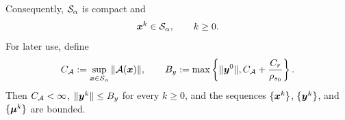 \begin{lemma}
\begin{equation}
    \label{eq:potential-and-objective-upper-bounds}
\end{equation}
Consequently, $\mathcal{S}_\alpha$ is compact and
\begin{equation}
    \bm{x}^k\in\mathcal{S}_\alpha,
    \qquad k\ge0.
    \label{eq:derived-x-trajectory-bound}
\end{equation}
For later use, define
\begin{equation}
    C_{\mathcal{A}}:=\sup_{\bm{x}\in\mathcal{S}_\alpha}\|\mathcal{A}(\bm{x})\|,
    \qquad
    B_y:=\max\left\{\|\bm{y}^0\|,C_{\mathcal{A}}+\frac{C_r}{\rho_{s_0}}\right\}.
    \label{eq:derived-operator-bounds}
\end{equation}
Then $C_{\mathcal{A}}<\infty$, $\|\bm{y}^k\|\le B_y$ for every $k\ge0$, and the sequences
$\{\bm{x}^k\}$, $\{\bm{y}^k\}$, and $\{\bm{\mu}^k\}$ are bounded.
\end{lemma}


